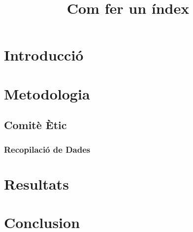 \documentclass{article}
\title{Com fer un índex}
\date{}
\begin{document}
\maketitle
\tableofcontents
\section{Introducció}
\section{Metodologia}
\subsection{Comitè Ètic}
\subsubsection{Recopilació de Dades}
\section{Resultats}
\section{Conclusion}
\end{document}
